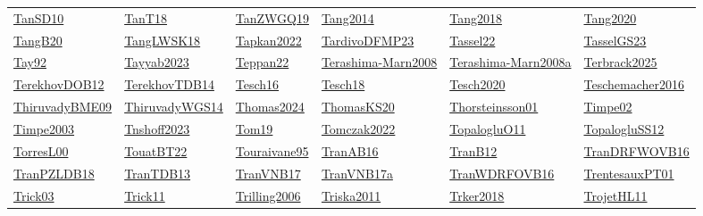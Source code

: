 \begin{longtable}{*{6}{l}}
\hyperref[detail:TanSD10]{TanSD10} & \hyperref[detail:TanT18]{TanT18} & \hyperref[detail:TanZWGQ19]{TanZWGQ19} & \hyperref[detail:Tang2014]{Tang2014} & \hyperref[detail:Tang2018]{Tang2018} & \hyperref[detail:Tang2020]{Tang2020}\\ 
\hyperref[detail:TangB20]{TangB20} & \hyperref[detail:TangLWSK18]{TangLWSK18} & \hyperref[detail:Tapkan2022]{Tapkan2022} & \hyperref[detail:TardivoDFMP23]{TardivoDFMP23} & \hyperref[detail:Tassel22]{Tassel22} & \hyperref[detail:TasselGS23]{TasselGS23}\\ 
\hyperref[detail:Tay92]{Tay92} & \hyperref[detail:Tayyab2023]{Tayyab2023} & \hyperref[detail:Teppan22]{Teppan22} & \hyperref[detail:Terashima-Marn2008]{Terashima-Marn2008} & \hyperref[detail:Terashima-Marn2008a]{Terashima-Marn2008a} & \hyperref[detail:Terbrack2025]{Terbrack2025}\\ 
\hyperref[detail:TerekhovDOB12]{TerekhovDOB12} & \hyperref[detail:TerekhovTDB14]{TerekhovTDB14} & \hyperref[detail:Tesch16]{Tesch16} & \hyperref[detail:Tesch18]{Tesch18} & \hyperref[detail:Tesch2020]{Tesch2020} & \hyperref[detail:Teschemacher2016]{Teschemacher2016}\\ 
\hyperref[detail:ThiruvadyBME09]{ThiruvadyBME09} & \hyperref[detail:ThiruvadyWGS14]{ThiruvadyWGS14} & \hyperref[detail:Thomas2024]{Thomas2024} & \hyperref[detail:ThomasKS20]{ThomasKS20} & \hyperref[detail:Thorsteinsson01]{Thorsteinsson01} & \hyperref[detail:Timpe02]{Timpe02}\\ 
\hyperref[detail:Timpe2003]{Timpe2003} & \hyperref[detail:Tnshoff2023]{Tnshoff2023} & \hyperref[detail:Tom19]{Tom19} & \hyperref[detail:Tomczak2022]{Tomczak2022} & \hyperref[detail:TopalogluO11]{TopalogluO11} & \hyperref[detail:TopalogluSS12]{TopalogluSS12}\\ 
\hyperref[detail:TorresL00]{TorresL00} & \hyperref[detail:TouatBT22]{TouatBT22} & \hyperref[detail:Touraivane95]{Touraivane95} & \hyperref[detail:TranAB16]{TranAB16} & \hyperref[detail:TranB12]{TranB12} & \hyperref[detail:TranDRFWOVB16]{TranDRFWOVB16}\\ 
\hyperref[detail:TranPZLDB18]{TranPZLDB18} & \hyperref[detail:TranTDB13]{TranTDB13} & \hyperref[detail:TranVNB17]{TranVNB17} & \hyperref[detail:TranVNB17a]{TranVNB17a} & \hyperref[detail:TranWDRFOVB16]{TranWDRFOVB16} & \hyperref[detail:TrentesauxPT01]{TrentesauxPT01}\\ 
\hyperref[detail:Trick03]{Trick03} & \hyperref[detail:Trick11]{Trick11} & \hyperref[detail:Trilling2006]{Trilling2006} & \hyperref[detail:Triska2011]{Triska2011} & \hyperref[detail:Trker2018]{Trker2018} & \hyperref[detail:TrojetHL11]{TrojetHL11}\\ 

\end{longtable}
